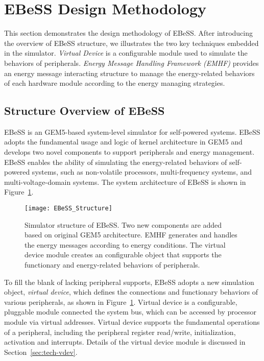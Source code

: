 \section{EBeSS Design Methodology}	\label{sec:tech}
%
This section demonstrates the design methodology of EBeSS.
After introducing the overview of EBeSS structure, we illustrates the two key techniques embedded in the simulator.
\emph{Virtual Device} is a configurable module used to simulate the behaviors of peripherals.
\emph{Energy Message Handling Framework (EMHF)} provides an energy message interacting structure to manage the energy-related behaviors of each hardware module according to the energy managing strategies.

\subsection{Structure Overview of EBeSS}		\label{sec:tech-structure}
%
EBeSS is an GEM5-based system-level simulator for self-powered systems. 
EBeSS adopts the fundamental usage and logic of kernel architecture in GEM5 and develops two novel components to support peripherals and energy management.
EBeSS enables the ability of simulating the energy-related behaviors of self-powered systems, such as non-volatile processors, multi-frequency systems, and multi-voltage-domain systems. 
The system architecture of EBeSS is shown in Figure~\ref{fig:techStructure}.

\begin{figure}[!htpb]
	\centering
	\vspace{-10pt}
	\texttt{[image: EBeSS\_Structure]}
	\vspace{-20pt}
	\caption{Simulator structure of EBeSS. Two new components are added based on original GEM5 architecture. EMHF generates and handles the energy messages according to energy conditions. The virtual device module creates an configurable object that supports the functionary and energy-related behaviors of peripherals.}		\label{fig:techStructure}
\end{figure}

%
To fill the blank of lacking peripheral supports, EBeSS adopts a new simulation object, \emph{virtual device}, which defines the connections and functionary behaviors of various peripherals, as shown in Figure~\ref{fig:techStructure}.
Virtual device is a configurable, pluggable module connected the system bus, which can be accessed by processor module via virtual addresses. 
Virtual device supports the fundamental operations of a peripheral, including the peripheral register read/write, initialization, activation and interrupts.
Details of the virtual device module is discussed in Section~\ref{sec:tech-vdev}.

